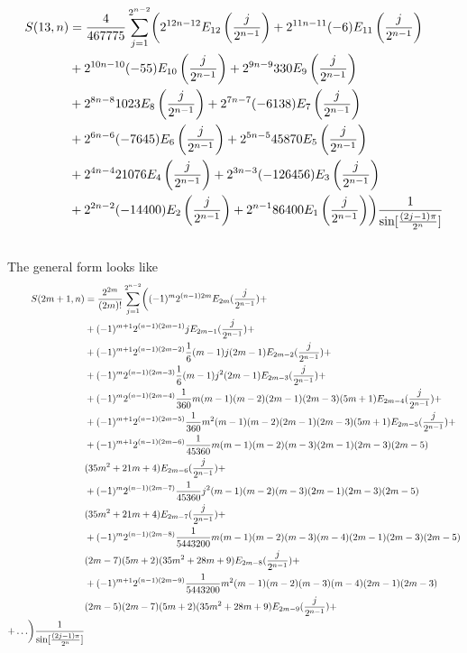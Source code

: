 \documentclass[fleqn,a4paper,9pt]{article}
\begin{document}
\begin{flushleft}
\begin{align}
S(13,n)&=\frac{4}{467775}\sum_{j=1}^{2^{n-2}}\biggl(2^{12n-12} E_{12}\left(\frac{j}{2^{n-1}}\right)+2^{11n-11}(-6)E_{11}\left(\frac{j}{2^{n-1}}\right)\\\notag
&+2^{10n-10} (-55) E_{10}\left(\frac{j}{2^{n-1}}\right)+2^{9n-9}330E_9\left(\frac{j}{2^{n-1}}\right)\\\notag
&+2^{8n-8}1023  E_8\left(\frac{j}{2^{n-1}}\right)+2^{7n-7}(-6138)E_7\left(\frac{j}{2^{n-1}}\right)\\\notag
&+2^{6n-6}  (-7645)E_6\left(\frac{j}{2^{n-1}}\right)+2^{5n-5}45870 E_5\left(\frac{j}{2^{n-1}}\right)\\\notag
&+2^{4n-4}21076 E_4\left(\frac{j}{2^{n-1}}\right)+2^{3n-3}(-126456)E_3\left(\frac{j}{2^{n-1}}\right)\\\notag
&+2^{2n-2}(- 14400)E_2\left(\frac{j}{2^{n-1}}\right)+2^{n-1} 86400 E_1\left(\frac{j}{2^{n-1}}\right)  \biggr)\frac{1}{\sin[\frac{(2j-1)\pi}{2^n}]}\\\notag
\end{align}
The general form looks like
\begin{align}
S(2m+1,n)&=\frac{2^{2m}}{(2m)!}\sum_{j=1}^{2^{n-2}}\biggl( (-1)^m 2^{(n-1)2m }E_{2m}(\frac{j}{2^{n-1}})+\\
&+(-1)^{m+1}2^{(n-1)(2m-1)}j E_{2m-1}(\frac{j}{2^{n-1}})+\\\notag
&+(-1)^{m+1}2^{(n-1)(2m-2)}\frac{1}{6}(m-1)j(2m-1)E_{2m-2}(\frac{j}{2^{n-1}})+\\\notag
&+(-1)^{m}2^{(n-1)(2m-3)}\frac{1}{6}(m-1)j^2(2m-1)E_{2m-3}(\frac{j}{2^{n-1}})+\\\notag
&+(-1)^{m}2^{(n-1)(2m-4)}\frac{1}{360}m(m-1)(m-2)(2m-1)(2m-3)(5m+1)E_{2m-4}(\frac{j}{2^{n-1}})+\\\notag
&+(-1)^{m+1}2^{(n-1)(2m-5)}\frac{1}{360}m^2(m-1)(m-2)(2m-1)(2m-3)(5m+1)E_{2m-5}(\frac{j}{2^{n-1}})+\\\notag
&+(-1)^{m+1}2^{(n-1)(2m-6)}\frac{1}{45360}m(m-1)(m-2)(m-3)(2m-1)(2m-3)(2m-5)\\\notag
&(35m^2+21m+4)E_{2m-6}(\frac{j}{2^{n-1}})+\\\notag
&+(-1)^{m}2^{(n-1)(2m-7)}\frac{1}{45360}j^2(m-1)(m-2)(m-3)(2m-1)(2m-3)(2m-5)\\\notag
&(35m^2+21m+4)E_{2m-7}(\frac{j}{2^{n-1}})+\\\notag
&+(-1)^{m}2^{(n-1)(2m-8)}\frac{1}{5443200}m(m-1)(m-2)(m-3)(m-4)(2m-1)(2m-3)(2m-5)\\\notag
&(2m-7)(5m+2)(35m^2+28m+9)E_{2m-8}(\frac{j}{2^{n-1}})+\\\notag
&+(-1)^{m+1}2^{(n-1)(2m-9)}\frac{1}{5443200}m^2(m-1)(m-2)(m-3)(m-4)(2m-1)(2m-3)\\\notag
&(2m-5)(2m-7)(5m+2)(35m^2+28m+9)E_{2m-9}(\frac{j}{2^{n-1}})+\\
+\ldots\biggr)\frac{1}{\sin[\frac{(2j-1)\pi}{2^n}]}\\
\end{align}



\end{flushleft}
\end{document}
